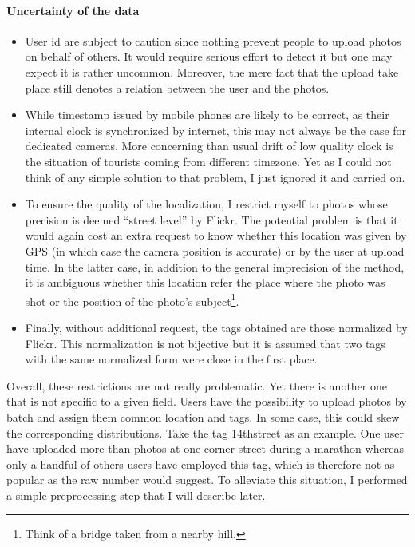 \paragraph{Uncertainty of the data}
\begin{itemize}
	\item User id are subject to caution since nothing prevent people to
 upload photos on behalf of others. It would require serious effort to
 detect it but one may expect it is rather uncommon. Moreover, the mere
 fact that the upload take place still denotes a relation between the
 user and the photos.
	\item While timestamp issued by mobile phones are likely to be correct,
 as their internal clock is synchronized by internet, this may not
 always be the case for dedicated cameras. More concerning than usual
 drift of low quality clock is the situation of tourists coming from
 different timezone. Yet as I could not think of any simple solution to
 that problem, I just ignored it and carried on.
	\item To ensure the quality of the localization, I restrict myself to
 photos whose precision is deemed \enquote{street level} by Flickr. The
 potential problem is that it would again cost an extra request to know
 whether this location was given by GPS (in which case the camera
 position is accurate) or by the user at upload time. In the latter
 case, in addition to the general imprecision of the method, it is
 ambiguous whether this location refer the place where the photo was
 shot or the position of the photo's subject\footnote{Think of a bridge
 taken from a nearby hill.}.
	\item Finally, without additional request, the tags obtained are those
 normalized by Flickr. This normalization is not bijective but it is
 assumed that two tags with the same normalized form were close in the
 first place.
\end{itemize}

Overall, these restrictions are not really problematic. Yet there is another
one that is not specific to a given field. Users have the possibility to
upload photos by batch and assign them common location and tags. In some case,
this could skew the corresponding distributions. Take the tag
\textsf{14thstreet} as an example. One user have uploaded more than
 photos at one corner street during a marathon whereas only a
handful of others users have employed this tag, which is therefore not as
popular as the raw number would suggest. To alleviate this situation, I
performed a simple preprocessing step that I will describe later.

